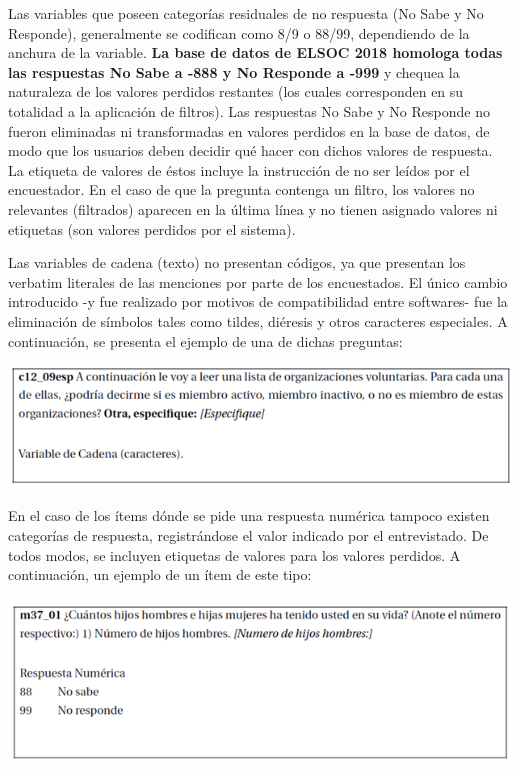 \documentclass[
  openany]{book}
\let\origfigure\figure
\let\endorigfigure\endfigure
\renewenvironment{figure}[1][2] {
    \expandafter\origfigure\expandafter[H]
} {
    \endorigfigure
}
\begin{document}
Las variables que poseen categorías residuales de no respuesta (No Sabe y No Responde), generalmente se codifican como 8/9 o 88/99, dependiendo de la anchura de la variable. \textbf{La base de datos de ELSOC 2018 homologa todas las respuestas No Sabe a -888 y No Responde a -999} y chequea la naturaleza de los valores perdidos restantes (los cuales corresponden en su totalidad a la aplicación de filtros). Las respuestas No Sabe y No Responde no fueron eliminadas ni transformadas en valores perdidos en la base de datos, de modo que los usuarios deben decidir qué hacer con dichos valores de respuesta. La etiqueta de valores de éstos incluye la instrucción de no ser leídos por el encuestador. En el caso de que la pregunta contenga un filtro, los valores no relevantes (filtrados) aparecen en la última línea y no tienen asignado valores ni etiquetas (son valores perdidos por el sistema).

Las variables de cadena (texto) no presentan códigos, ya que presentan los verbatim literales de las menciones por parte de los encuestados. El único cambio introducido -y fue realizado por motivos de compatibilidad entre softwares- fue la eliminación de símbolos tales como tildes, diéresis y otros caracteres especiales. A continuación, se presenta el ejemplo de una de dichas preguntas:

\begin{figure}
\centering
\includegraphics{../Imagenes/Figura_item_2018d.png}
\caption{\label{fig:item} Ejemplo de Pregunta con Múltiples Ítemes en ELSOC}
\end{figure}

En el caso de los ítems dónde se pide una respuesta numérica tampoco existen categorías de respuesta, registrándose el valor indicado por el entrevistado. De todos modos, se incluyen etiquetas de valores para los valores perdidos. A continuación, un ejemplo de un ítem de este tipo:

\begin{figure}
\centering
\includegraphics{../Imagenes/Figura_item_2018e.png}
\caption{\label{fig:item} Ejemplo de Pregunta con Múltiples Ítemes en ELSOC}
\end{figure}
\end{document}
